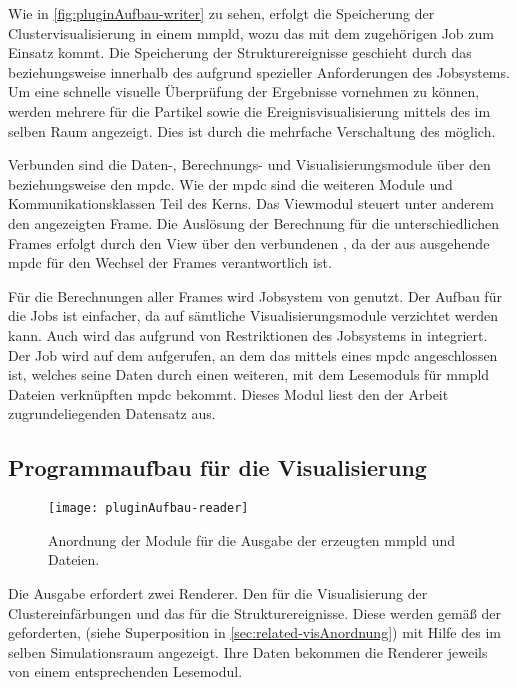 Wie in \autoref{fig:pluginAufbau-writer} zu sehen, erfolgt die Speicherung der Clustervisualisierung in einem \gls{mmpld}, wozu das  mit dem zugehörigen Job zum Einsatz kommt. Die Speicherung der Strukturereignisse geschieht durch das  beziehungsweise innerhalb des \SECalc aufgrund spezieller Anforderungen des  Jobsystems. Um eine schnelle visuelle Überprüfung der Ergebnisse vornehmen zu können, werden mehrere  für die Partikel sowie die Ereignisvisualisierung mittels des  im selben Raum angezeigt. Dies ist durch die mehrfache Verschaltung des  möglich.

Verbunden sind die Daten-, Berechnungs- und Visualisierungsmodule über den \SEDC beziehungsweise den \gls{mpdc}. Wie der \gls{mpdc} sind die weiteren Module und Kommunikationsklassen Teil des  Kerns. Das Viewmodul steuert unter anderem den angezeigten Frame. Die Auslösung der Berechnung für die unterschiedlichen Frames erfolgt durch den View über den verbundenen , da der aus \SECalc ausgehende \gls{mpdc} für den Wechsel der Frames verantwortlich ist.

Für die Berechnungen aller Frames wird Jobsystem von  genutzt. Der Aufbau für die Jobs ist einfacher, da auf sämtliche Visualisierungsmodule verzichtet werden kann. Auch wird das  aufgrund von Restriktionen des Jobsystems in \SECalc integriert. Der Job wird auf dem  aufgerufen, an dem das \SECalc mittels eines \gls{mpdc} angeschlossen ist, welches seine Daten durch einen weiteren, mit dem Lesemoduls für \gls{mmpld} Dateien verknüpften \gls{mpdc} bekommt. Dieses Modul liest den der Arbeit zugrundeliegenden Datensatz aus.

\subsection*{Programmaufbau für die Visualisierung}\label{sec:pluginaufbau-vis}
\begin{figure}
	\texttt{[image: pluginAufbau-reader]}
	\caption{Anordnung der  Module für die Ausgabe der erzeugten \gls{mmpld} und \MMSE Dateien.}\label{fig:pluginAufbau-reader}
\end{figure}

Die Ausgabe erfordert zwei Renderer. Den  für die Visualisierung der Clustereinfärbungen und das  für die Strukturereignisse. Diese werden gemäß der geforderten,  (siehe Superposition in \autoref{sec:related-visAnordnung}) mit Hilfe des  im selben Simulationsraum angezeigt. Ihre Daten bekommen die Renderer jeweils von einem entsprechenden Lesemodul. 

